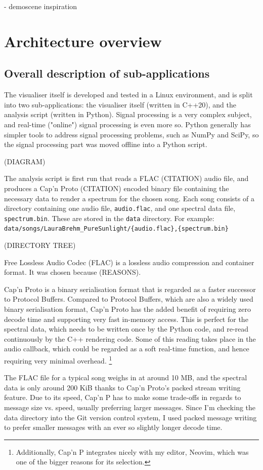 \documentclass[11pt]{article}
\begin{document}
- demoscene inspiration

\section{Architecture overview}
\subsection{Overall description of sub-applications}
The visualiser itself is developed and tested in a Linux environment, and is split into two sub-applications:
the visualiser itself (written in C++20), and the analysis script (written in Python). Signal processing is a
very complex subject, and real-time ("online") signal processing is even more so. Python generally has simpler
tools to address signal processing problems, such as NumPy and SciPy, so the signal processing part was moved
offline into a Python script.

(DIAGRAM)

The analysis script is first run that reads a FLAC (CITATION) audio file, and produces a Cap'n Proto (CITATION)
encoded binary file containing the necessary data to render a spectrum for the chosen song. Each song consists
of a directory containing one audio file, \verb|audio.flac|, and one spectral data file, \verb|spectrum.bin|.
These are stored in the \verb|data| directory. For example: \\
\verb|data/songs/LauraBrehm_PureSunlight/{audio.flac},{spectrum.bin}|

(DIRECTORY TREE)

Free Lossless Audio Codec (FLAC) is a lossless audio compression and container format. It was chosen because
(REASONS).

Cap'n Proto is a binary serialisation format that is regarded as a faster successor to Protocol Buffers.
Compared to Protocol Buffers, which are also a widely used binary serialisation format, Cap'n Proto has the
added benefit of requiring zero decode time and supporting very fast in-memory access. This is perfect for the
spectral data, which needs to be written once by the Python code, and re-read continuously by the C++
rendering code. Some of this reading takes place in the audio callback, which could be regarded as a soft
real-time function, and hence requiring very minimal overhead.
\footnote{Additionally, Cap'n P integrates nicely with my editor, Neovim, which was one of the bigger reasons
for its selection.}

The FLAC file for a typical song weighs in at around 10 MB, and the spectral data is only around 200 KiB
thanks to Cap'n Proto's packed stream writing feature. Due to its speed, Cap'n P has to make some
trade-offs in regards to message size vs. speed, usually preferring larger messages. Since I'm checking the
data directory into the Git version control system, I used packed message writing to prefer smaller messages
with an ever so slightly longer decode time.
\end{document}
